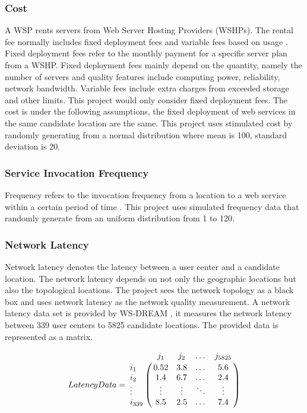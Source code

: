 \subsubsection{Cost}
\label{sec:costdata}
A WSP rents servers from Web Server Hosting Providers (WSHPs). 
The rental fee  normally includes fixed deployment fees and variable fees based on usage \cite{Sun:2003:}. 
Fixed deployment fees  refer to the monthly payment for a specific server plan from a WSHP. 
Fixed deployment fees  mainly depend on the quantity, namely the number of servers and quality features include computing power, 
reliability, network bandwidth. Variable fees include extra charges from exceeded storage and other limits.
This project would only consider fixed deployment fees. The cost is under the following assumptions, 
the fixed deployment of web services in the same candidate location are the same. 
This project uses stimulated cost by randomly generating from a normal distribution where mean is 100, standard deviation is 20. 

\subsubsection{Service Invocation Frequency}
\label{sec:frequencydata}
Frequency refers to the invocation frequency from a location to a web service within a certain period of time \cite{Huang:2013:}. 
This project uses simulated frequency data that randomly generate from an uniform distribution from 1 to 120.

\subsubsection{Network Latency}
\label{sec:latencydata}
Network latency denotes the latency between a user center and a candidate location. 
The network latency depends on not only the geographic locations but also the topological locations. 
The project sees the network topology as a black box and uses network latency as the network quality measurement. 
A network latency data set is provided by WS-DREAM \cite{6076756} \cite{5552800}, 
it measures the network latency between 339 user centers to 5825 candidate locations. 
The provided data is represented as a matrix.

$$
Latency Data = \bbordermatrix{~ & j_{1} & j_{2} & \dots &j_{5825}  \cr
					i_{1}	&0.52 &3.8 &\dots &5.6	\cr
					i_{2}	&1.4  &6.7 &\dots &2.4 \cr
					\vdots  &\vdots &\vdots &\ddots &\vdots \cr
					i_{339}	&8.5 &2.5 &\dots &7.4 \cr}
$$


